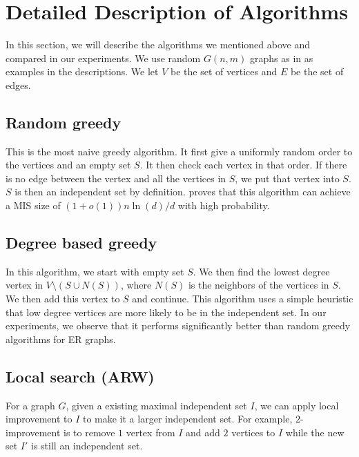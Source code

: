 \section{Detailed Description of Algorithms}\label{sec:detail-algs}

In this section, we will describe the algorithms we mentioned above and compared in our experiments. We use random $G(n,m)$ graphs as in \cite{coja2015independent} as examples in the descriptions. We let $V$ be the set of vertices and $E$ be the set of edges.

\subsection{Random greedy}
This is the most naive greedy algorithm. It first give a uniformly random order to the vertices and an empty set $S$. It then check each vertex in that order. If there is no edge between the vertex and all the vertices in $S$, we put that vertex into $S$. $S$ is then an independent set by definition. \cite{grimmett1975colouring} proves that this algorithm can achieve a MIS size of $(1+o(1))n\ln(d)/d$ with high probability.

\subsection{Degree based greedy}
In this algorithm, we start with empty set $S$. We then find the lowest degree vertex in $V \setminus (S\cup N(S))$, where $N(S)$ is the neighbors of the vertices in $S$. We then add this vertex to $S$ and continue. This algorithm uses a simple heuristic that low degree vertices are more likely to be in the independent set.  In our experiments, we observe that it performs significantly better than random greedy algorithms for ER graphs.

\subsection{Local search (ARW)}
\label{sec:ARW}
For a graph $G$, given a existing maximal independent set $I$, we can apply local improvement to $I$ to make it a larger independent set. For example, $2$-improvement is to remove $1$ vertex from $I$ and add $2$ vertices to $I$ while the new set $I'$ is still an independent set.

